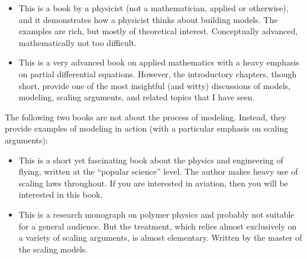 \begin{itemize}
\item {}  
  This is a book by a physicist (not a mathematician, applied or
  otherwise), and it demonstrates how a physicist thinks about
  building models. The examples are rich, but mostly of theoretical
  interest. Conceptually advanced, mathematically not too difficult.

\item {}
  This is a very advanced book on applied mathematics with a 
  heavy emphasis on partial differential equations. However, the 
  introductory chapters, though short, provide one of the most
  insightful (and witty) discussions of models, modeling, scaling
  arguments, and related topics that I have seen.
\end{itemize}

The following two books are not about the process of modeling.
Instead, they provide examples of modeling in action (with a 
particular emphasis on scaling arguments):
\begin{itemize}
\item {}
  This is a short yet fascinating book about the physics and
  engineering of flying, written at the ``popular science'' level. The
  author makes heavy use of scaling laws throughout. If you are
  interested in aviation, then you will be interested in this book.

\item {}
  This is a research monograph on polymer physics and probably not
  suitable for a general audience. But the treatment, which relies
  almost exclusively on a variety of scaling arguments, is almost
  elementary. Written by the master of the scaling models.
\end{itemize}
\clearpage

\thispagestyle{empty}

\cleardoublepage